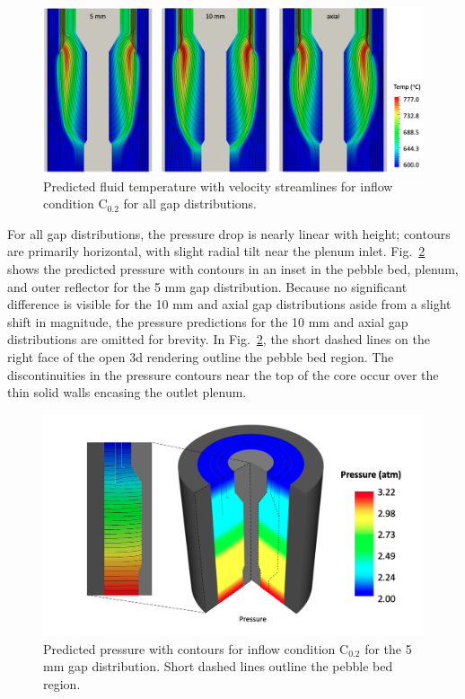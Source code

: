 \begin{figure}[h!]
\centering
\hspace{1.2cm}
\includegraphics[width=0.9\linewidth]{figs/fluid_temp_all.png}
\caption{Predicted fluid temperature with velocity streamlines for inflow condition C$_\text{0.2}$ for all gap distributions.}
\label{fig:fluid_temp_all}
\end{figure}

For all gap distributions, the pressure drop is nearly linear with height; contours are primarily horizontal, with slight radial tilt near the plenum inlet. Fig.\ \ref{fig:pressure_all} shows the predicted pressure with contours in an inset in the pebble bed, plenum, and outer reflector for the 5 \si{\milli\meter} gap distribution. Because no significant difference is visible for the 10 \si{\milli\meter} and axial gap distributions aside from a slight shift in magnitude, the pressure predictions for the 10 \si{\milli\meter} and axial gap distributions are omitted for brevity. In Fig.\ \ref{fig:pressure_all}, the short dashed lines on the right face of the open \gls{3d} rendering outline the pebble bed region. The discontinuities in the pressure contours near the top of the core occur over the thin solid walls encasing the outlet plenum.

\begin{figure}[h!]
\centering
\hspace{1.2cm}
\includegraphics[height=0.4\linewidth]{figs/pressure_all.png}
\caption{Predicted pressure with contours for inflow condition C$_\text{0.2}$ for the 5 \si{\milli\meter} gap distribution. Short dashed lines outline the pebble bed region.}
\label{fig:pressure_all}
\end{figure}

